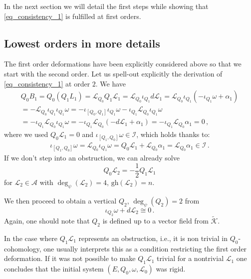 \documentclass[a4paper,12pt]{article}
\numberwithin{equation}{section} %
\renewcommand{\simeq}{\cong}
\newcommand{\gh}[1]{\mathrm{gh}(#1)}
\newcommand{\algA}{\mathcal{A}}
\def\cK{\mathcal{K}}
\def\cL{\mathcal{L}}
\newcommand{\wker}{{\widetilde{\cK}}}
\newcommand{\h}{\cL}
\begin{document}
In the next section we will detail the first steps while showing that \eqref{eq_consistency_1} is fulfilled at first orders.


\subsection{Lowest orders in more details}

The first order deformations have been explicitly considered above so that  we start with the second order. Let us spell-out explicitly  the derivation of  \eqref{eq_consistency_1} at order $2$. We have 
\begin{multline}
	Q_0B_1=Q_0( Q_1 L_1 ) = \mathcal{L}_{Q_0}Q_1\h_1 =  \mathcal{L}_{Q_0}\iota_{Q_1}d\h_1 = \mathcal{L}_{Q_0}\iota_{Q_1}(-\iota_{Q_1}\omega + \alpha_1) \\
	= -\mathcal{L}_{Q_0}\iota_{Q_1}\iota_{Q_1}\omega = -\iota_{[Q_0,Q_1]}\iota_{Q_1}\omega - \iota_{Q_1}\mathcal{L}_{Q_0}\iota_{Q_1}\omega \\
	 = - \iota_{Q_1}\mathcal{L}_{Q_0}\iota_{Q_1}\omega = -\iota_{Q_1}\mathcal{L}_{Q_0}(-d\h_1 + \alpha_1) = -\iota_{Q_1}\mathcal{L}_{Q_0}\alpha_1 = 0\,,
\end{multline}			
where we used $Q_0\cL_1=0$ and $\iota_{[Q_1,Q_0]}\omega\in \mathcal{I}$,
which holds thanks to:
\begin{align}
	\iota_{[Q_1,Q_0]}\omega = \mathcal{L}_{Q_0}\iota_{Q_1}\omega = Q_0\h_1 + \mathcal{L}_{Q_0}\alpha_1 = \mathcal{L}_{Q_0}\alpha_1 \in \mathcal{I} \label{eq_i10_omega}\,.
\end{align}
If we don't step into an obstruction, we can already solve
	\begin{equation}
		Q_0 \h_2 =  -\frac{1}{2} Q_1 \h_1
	\end{equation}
for $ \h_2 \in \algA$ with $ \deg_\psi(\h_2) = 4$, $\gh{\cL_2}=n$.
	
We then proceed to obtain a vertical $Q_2$, $ \deg_\psi(Q_2) = 2$ from
	\begin{equation}
		\iota_{Q_2} \omega + d \h_2 \simeq 0\,.
	\end{equation}
Again, one should note that $Q_2$ is defined up to a vector field from $\wker$.

In the case where $Q_1\h_1$ represents an obstruction, i.e., it is non trivial in $Q_0$-cohomology, one usually interprets this as a condition restricting the first order deformation. If it was not possible to make $Q_1\cL_1$ trivial for a nontrivial $\cL_1$ one concludes that the initial system $(E,Q_0,\omega,\h_0)$ was rigid.
\end{document}
